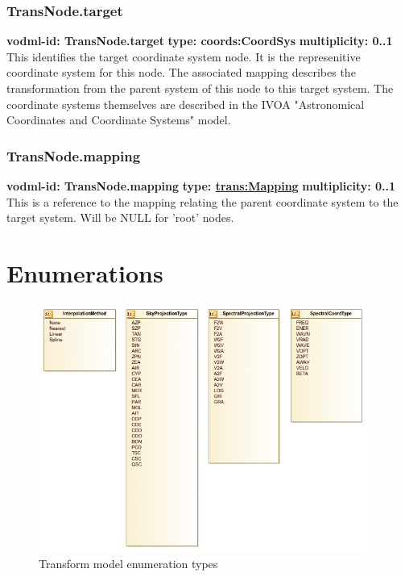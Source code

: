     \subsubsection{TransNode.target}
      \textbf{vodml-id: TransNode.target} \newline
      \textbf{type: coords:CoordSys} \newline
      \textbf{multiplicity: 0..1} \newline 
      This identifies the target coordinate system node. It is the represenitive coordinate system for this node. The associated mapping describes the transformation from the parent system of this node to this target system. The coordinate systems themselves are described in the IVOA "Astronomical Coordinates and Coordinate Systems" model.

    \subsubsection{TransNode.mapping}
      \textbf{vodml-id: TransNode.mapping} \newline
      \textbf{type: \hyperref[sect:Mapping]{trans:Mapping}} \newline
      \textbf{multiplicity: 0..1} \newline 
      This is a reference to the mapping relating the parent coordinate system to the target system. Will be NULL for 'root' nodes.

\pagebreak
\section{Enumerations}

  \begin{figure}[h]
  \begin{center}
    \includegraphics[width=4.25in]{diagrams/enumerations.png}
    \caption{Transform model enumeration types}\label{fig:Enums}
  \end{center}
  \end{figure}

